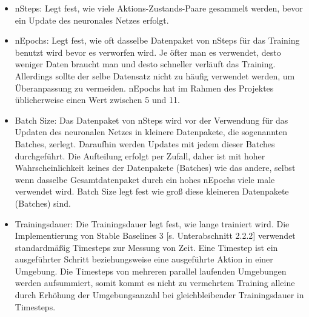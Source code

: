 \begin{itemize}
\item nSteps: Legt fest, wie viele Aktions-Zustands-Paare gesammelt werden, bevor ein Update des neuronales Netzes erfolgt.

\item nEpochs: Legt fest, wie oft dasselbe Datenpaket von nSteps für das Training benutzt wird bevor es verworfen wird. Je öfter man es verwendet, desto weniger Daten braucht man und desto schneller verläuft das Training. Allerdings sollte der selbe Datensatz nicht zu häufig verwendet werden, um Überanpassung zu vermeiden. nEpochs hat im Rahmen des Projektes üblicherweise einen Wert zwischen 5 und 11.

\item Batch Size: Das Datenpaket von nSteps wird vor der Verwendung für das Updaten des neuronalen Netzes in kleinere Datenpakete, die sogenannten Batches, zerlegt. Daraufhin werden Updates mit jedem dieser Batches durchgeführt. Die Aufteilung erfolgt per Zufall, daher ist mit hoher Wahrscheinlichkeit keines der Datenpakete (Batches) wie das andere, selbst wenn dasselbe Gesamtdatenpaket durch ein hohes nEpochs viele male verwendet wird. Batch Size legt fest wie groß diese kleineren Datenpakete (Batches) sind.

\item 
Trainingsdauer: Die Trainingsdauer legt fest, wie lange trainiert wird. Die Implementierung von Stable Baselines 3 [s. Unterabschnitt 2.2.2] verwendet standardmäßig Timesteps zur Messung von Zeit. Eine Timestep ist ein ausgeführter Schritt beziehungsweise eine ausgeführte Aktion in einer Umgebung. Die Timesteps von mehreren parallel laufenden Umgebungen werden aufsummiert, somit kommt es nicht zu vermehrtem Training alleine durch Erhöhung der Umgebungsanzahl bei gleichbleibender Trainingsdauer in Timesteps.
\end{itemize}